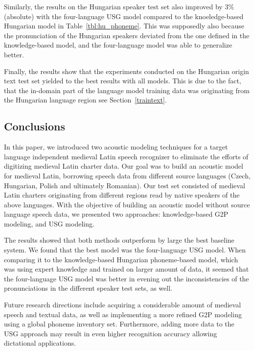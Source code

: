 \documentclass[runningheads,a4paper]{llncs}
\begin{document}
Similarly, the results on the Hungarian speaker test set also improved by $3\%$ (absolute) with the four-language USG model compared to the knoeledge-based Hungarian model in Table~\ref{tbl:hu_phoneme}.
This was supposedly also because the pronunciation of the Hungarian speakers deviated from the one defined in the knowledge-based model, and the four-language model was able to generalize better. 

Finally, the results show that the experiments conducted on the Hungarian origin text test set yielded to the best results with all models.
This is due to the fact, that the in-domain part of the language model training data was originating from the Hungarian language region see Section~\ref{traintext}.
\subsection{Conclusions}
In this paper, we introduced two acoustic modeling techniques for a target language independent medieval Latin speech recognizer to eliminate the efforts of digitizing medieval Latin charter data.
Our goal was to build an acoustic model for medieval Latin, borrowing speech data from different source languages (Czech, Hungarian, Polish and ultimately Romanian).
Our test set consisted of medieval Latin charters originating from different regions read by native speakers of the above languages.
With the objective of building an acoustic model without source language speech data, we presented two approaches: knowledge-based G2P modeling, and USG modeling.

The results showed that both methods outperform by large the best baseline system. 
We found that the best model was the four-language USG model.
When comparing it to the knowledge-based Hungarian phoneme-based model, which was using expert knowledge and trained on larger amount of data, it seemed that the four-language USG model was better in evening out the inconsistencies of the pronunciations in the different speaker test sets, as well.

Future research directions include acquiring a considerable amount of medieval speech and textual data, as well as implementing a more refined G2P modeling using a global phoneme inventory set. Furthermore, adding more data to the USG approach may result in even higher recognition accuracy allowing dictational applications.



\end{document}
